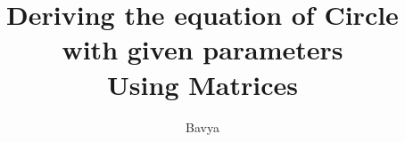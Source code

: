 \documentclass[journal,10pt,twocolumn]{article}
\begin{document}
\newtheorem{theorem}{Theorem}[section]
\newtheorem{problem}{Problem}
\newtheorem{proposition}{Proposition}[section]
\newtheorem{lemma}{Lemma}[section]
\newtheorem{corollary}[theorem]{Corollary}
\newtheorem{example}{Example}[section]
\newtheorem{definition}[problem]{Definition}
\newcommand{\BEQA}{\begin{eqnarray}}
\newcommand{\EEQA}{\end{eqnarray}}
\newcommand{\define}{\stackrel{\triangle}{=}}
\newcommand*\circled[1]{\tikz[baseline=(char.base)]{
    \node[shape=circle,draw,inner sep=2pt] (char) {#1};}}

%
\providecommand{\mbf}{\mathbf}
\providecommand{\pr}[1]{\ensuremath{\Pr\left(#1\right)}}
\providecommand{\re}[1]{\ensuremath{\text{Re}\left(#1\right)}}
\providecommand{\im}[1]{\ensuremath{\text{Im}\left(#1\right)}}
\providecommand{\qfunc}[1]{\ensuremath{Q\left(#1\right)}}
\providecommand{\sbrak}[1]{\ensuremath{{}\left[#1\right]}}
\providecommand{\lsbrak}[1]{\ensuremath{{}\left[#1\right.}}
\providecommand{\rsbrak}[1]{\ensuremath{{}\left.#1\right]}}
\providecommand{\brak}[1]{\ensuremath{\left(#1\right)}}
\providecommand{\lbrak}[1]{\ensuremath{\left(#1\right.}}
\providecommand{\rbrak}[1]{\ensuremath{\left.#1\right)}}
\providecommand{\cbrak}[1]{\ensuremath{\left\{#1\right\}}}
\providecommand{\lcbrak}[1]{\ensuremath{\left\{#1\right.}}
\providecommand{\rcbrak}[1]{\ensuremath{\left.#1\right\}}}
\newcommand{\sgn}{\mathop{\mathrm{sgn}}}
\providecommand{\system}{\overset{\mathcal{H}}{ \longleftrightarrow}}
\newcommand{\solution}{\noindent \textbf{Solution: }}
\newcommand{\cosec}{\,\text{cosec}\,}
\providecommand{\dec}[2]{\ensuremath{\overset{#1}{\underset{#2}{\gtrless}}}}
\newcommand{\myvec}[1]{\ensuremath{\begin{pmatrix}#1\end{pmatrix}}}
\newcommand{\mydet}[1]{\ensuremath{\begin{vmatrix}#1\end{vmatrix}}}
	\newcommand*{\permcomb}[4][0mu]{{{}^{#3}\mkern#1#2_{#4}}}
\newcommand*{\perm}[1][-3mu]{\permcomb[#1]{P}}
\newcommand*{\comb}[1][-1mu]{\permcomb[#1]{C}}
\let\vec\mathbf
\title{
{Deriving the equation of Circle with given parameters \\
Using Matrices}\\
}
\author{Bavya}
\maketitle
\tableofcontents
\end{document}

